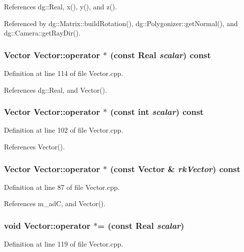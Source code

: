 References dg::Real, x(), y(), and z().

Referenced by dg::Matrix::build\-Rotation(), dg::Polygonizer::get\-Normal(), and dg::Camera::get\-Ray\-Dir().
\subsubsection{\setlength{\rightskip}{0pt plus 5cm}Vector Vector::operator $\ast$ (const {\bf Real} {\em scalar}) const}\label{classdg_1_1Vector_a25}




Definition at line 114 of file Vector.cpp.

References dg::Real, and Vector().
\subsubsection{\setlength{\rightskip}{0pt plus 5cm}Vector Vector::operator $\ast$ (const int {\em scalar}) const}\label{classdg_1_1Vector_a23}




Definition at line 102 of file Vector.cpp.

References Vector().
\subsubsection{\setlength{\rightskip}{0pt plus 5cm}Vector Vector::operator $\ast$ (const Vector \& {\em rk\-Vector}) const}\label{classdg_1_1Vector_a21}




Definition at line 87 of file Vector.cpp.

References m\_\-ad\-C, and Vector().
\subsubsection{\setlength{\rightskip}{0pt plus 5cm}void Vector::operator $\ast$= (const {\bf Real} {\em scalar})}\label{classdg_1_1Vector_a26}




Definition at line 119 of file Vector.cpp.

